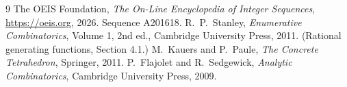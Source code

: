 \documentclass[11pt,a4paper]{article}
\theoremstyle{plain}
\theoremstyle{definition}
\begin{document}
\begin{thebibliography}{9}
 The OEIS Foundation, \emph{The On-Line Encyclopedia of Integer
Sequences}, \url{https://oeis.org}, 2026. Sequence A201618.
 R.~P.~Stanley, \emph{Enumerative Combinatorics}, Volume 1, 2nd ed.,
Cambridge University Press, 2011. (Rational generating functions, Section 4.1.)
 M.~Kauers and P.~Paule, \emph{The Concrete Tetrahedron}, Springer, 2011.
 P.~Flajolet and R.~Sedgewick, \emph{Analytic Combinatorics}, Cambridge
University Press, 2009.
\end{thebibliography}
\end{document}
